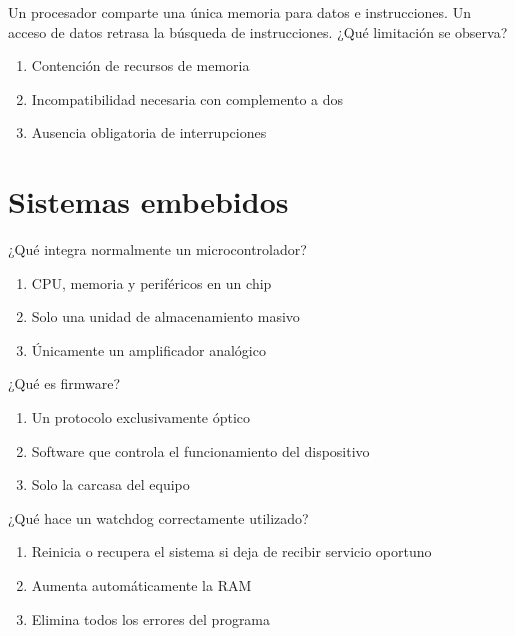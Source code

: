 \noindent\begin{minipage}{\linewidth}\setlength{\parskip}{4pt}\label{q:H-044}
Un procesador comparte una única memoria para datos e instrucciones. Un acceso de datos retrasa la búsqueda de instrucciones. ¿Qué limitación se observa?
\begin{enumerate}[label=\Alph*),nosep]
\item Contención de recursos de memoria
\item Incompatibilidad necesaria con complemento a dos
\item Ausencia obligatoria de interrupciones
\end{enumerate}\end{minipage}\par\medskip

\section{Sistemas embebidos}

\noindent\begin{minipage}{\linewidth}\setlength{\parskip}{4pt}\label{q:H-045}
¿Qué integra normalmente un microcontrolador?
\begin{enumerate}[label=\Alph*),nosep]
\item CPU, memoria y periféricos en un chip
\item Solo una unidad de almacenamiento masivo
\item Únicamente un amplificador analógico
\end{enumerate}\end{minipage}\par\medskip

\noindent\begin{minipage}{\linewidth}\setlength{\parskip}{4pt}\label{q:H-046}
¿Qué es firmware?
\begin{enumerate}[label=\Alph*),nosep]
\item Un protocolo exclusivamente óptico
\item Software que controla el funcionamiento del dispositivo
\item Solo la carcasa del equipo
\end{enumerate}\end{minipage}\par\medskip

\noindent\begin{minipage}{\linewidth}\setlength{\parskip}{4pt}\label{q:H-047}
¿Qué hace un watchdog correctamente utilizado?
\begin{enumerate}[label=\Alph*),nosep]
\item Reinicia o recupera el sistema si deja de recibir servicio oportuno
\item Aumenta automáticamente la RAM
\item Elimina todos los errores del programa
\end{enumerate}\end{minipage}\par\medskip


